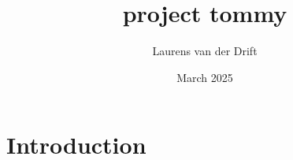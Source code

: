 \documentclass{article}
\title{project tommy}
\author{Laurens van der Drift}
\date{March 2025}
\begin{document}
\maketitle

\section{Introduction}
\end{document}
